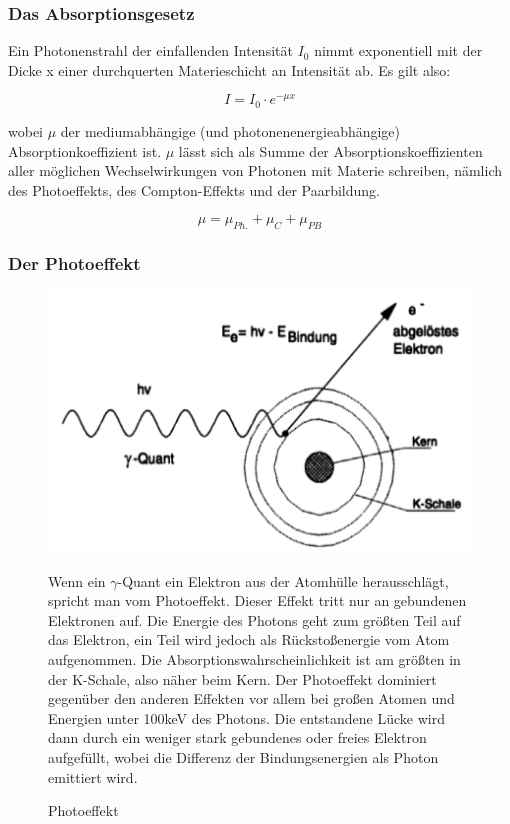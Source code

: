 \subsubsection{Das Absorptionsgesetz}

Ein Photonenstrahl der einfallenden Intensität $I_0$ nimmt exponentiell mit der Dicke x einer durchquerten Materieschicht an Intensität ab. Es gilt also:

$$ I = I_0\cdot e^{-\mu x} $$

wobei $\mu$ der mediumabhängige (und photonenenergieabhängige) Absorptionkoeffizient ist. $\mu$ lässt sich als Summe der Absorptionskoeffizienten aller möglichen Wechselwirkungen von Photonen mit Materie schreiben, nämlich des Photoeffekts, des Compton-Effekts und der Paarbildung.

$$\mu = \mu_{Ph.} + \mu_{C} + \mu_{PB} $$

\subsubsection{Der Photoeffekt}

\begin{figure}[H]
	\begin{minipage}{0.59\textwidth}
	\centering \includegraphics[width=\textwidth]{BilderTheorie/Photoeffekt.png}
	\caption{Photoeffekt}
	\end{minipage}
	\begin{minipage}{0.4\textwidth}
	Wenn ein $\gamma$-Quant ein Elektron aus der Atomhülle herausschlägt, spricht man vom Photoeffekt. Dieser Effekt tritt nur an gebundenen Elek\-tro\-nen auf. Die Energie des Photons geht zum größten Teil auf das Elektron, ein Teil wird jedoch als Rückstoßenergie vom Atom aufgenommen. Die Ab\-sorp\-tions\-wahrscheinlichkeit ist am größten in der K-Schale, also näher beim Kern. Der Photoeffekt dominiert gegenüber den anderen Effekten vor allem bei großen Atomen und Energien unter 100keV des Photons. Die entstandene Lücke wird dann durch ein weniger stark gebundenes oder freies Elektron aufgefüllt, wobei die Differenz der Bindungsenergien als Photon emittiert wird.
	\end{minipage}
\end{figure}

